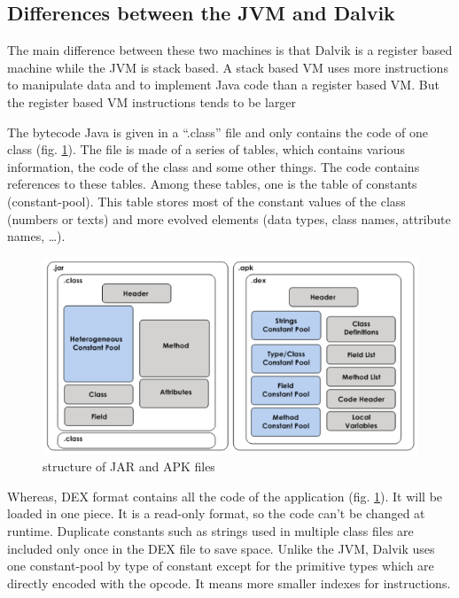 \documentclass{sigplanconf}
\def \DALVIK{\mbox{Dalvik}\xspace}
\def \JVM{JVM\xspace}
\def \DEX{\mbox{DEX}\xspace}
\begin{document}
    \subsection{Differences between the JVM and Dalvik}

      The main difference between these two machines is that \DALVIK is a register based machine while the \JVM is stack based.
      A stack based VM uses more instructions to manipulate data and to implement Java code than a register based VM.
      But the register based VM instructions tends to be larger \cite{ieee-paul-kundu-energy-perspective}

      The bytecode Java is given in a ``.class'' file and only contains the code of one class (fig. \ref{SJA}).
      The file is made of a series of tables, which contains various information, the code of the class and some other things.
      The code contains references to these tables.
      Among these tables, one is the table of constants (constant-pool).
      This table stores most of the constant values of the class (numbers or texts)
      and more evolved elements (data types, class names, attribute names, \dots).

      \begin{figure}[h]
        \centering \includegraphics[width=\columnwidth]{structure-jar-apk.png}
        \caption{structure of JAR and APK files}
        \label{SJA}
      \end{figure}

      Whereas, \DEX format contains all the code of the application (fig. \ref{SJA}).
      It will be loaded in one piece.
      It is a read-only format, so the code can't be changed at runtime.
      Duplicate constants such as strings used in multiple class files
      are included only once in the \DEX file to save space.
      Unlike the \JVM, \DALVIK uses one constant-pool by type of constant
      except for the primitive types which are directly encoded with the opcode.
      It means more smaller indexes for instructions.\\
\end{document}
